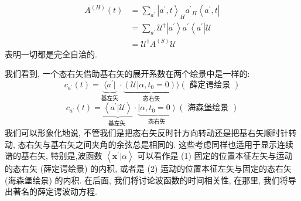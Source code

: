 \documentclass[lang=cn,newtx,10pt,scheme=chinese,thmcnt=section]{elegantbook}
\begin{document}
\begin{equation}
	\begin{aligned}
		{A}^{\left( H\right) }\left( t\right) &= \mathop{\sum }\limits_{{a}^{\prime }}{\left| {a}^{\prime }, t\right\rangle }_{H}{a}^{\prime }{}_{H}\left\langle {{a}^{\prime }, t}\right|\\
		&= \mathop{\sum }\limits_{{a}^{\prime }}\mathcal{U}^{ \dagger }\left| {a}^{\prime }\right\rangle {a}^{\prime }\left\langle {a}^{\prime }\right|\mathcal{U}\\
		&= \mathcal{U}^{ \dagger }{A}^{\left( S\right) }\mathcal{U}
	\end{aligned}
\end{equation}
表明一切都是完全自洽的.

我们看到, 一个态右矢借助基右矢的展开系数在两个绘景中是一样的:
\begin{equation}
c_{a^\prime}(t)=\underset{\text{基左矢}}{\underbrace{\langle a^\prime |}}\cdot\underset{\text{态右矢}}{\underbrace{ (\mathcal{U} | \alpha ,{t}_{0} = 0) \rangle }} ( \text{ 薛定谔绘景 })
\end{equation}
\begin{equation}
	{c}_{{a}^{\prime }}\left( t\right) = \underset{\text{基左矢 }}{\underbrace{\left\langle {a}^{\prime } | \mathcal{U}\right\rangle }} \cdot \underset{\text{态右矢 }}{\underbrace{\left| \alpha ,{t}_{0} = 0\right\rangle }}\left( \text{ 海森堡绘景 }\right)
\end{equation}
我们可以形象化地说, 不管我们是把态右矢反时针方向转动还是把基右矢顺时针转动, 态右矢与基右矢之间夹角的余弦总是相同的. 这些考虑同样也适用于显示连续谱的基右矢, 特别是,波函数 $\left\langle {{\mathbf{x}}^{\prime } | \alpha }\right\rangle$ 可以看作是 (1) 固定的位置本征左矢与运动的态右矢 (薛定谔绘景) 的内积, 或者是 (2) 运动的位置本征左矢与固定的态右矢 (海森堡绘景) 的内积. 在后面, 我们将讨论波函数的时间相关性, 在那里, 我们将导出著名的薛定谔波动方程.
\end{document}
